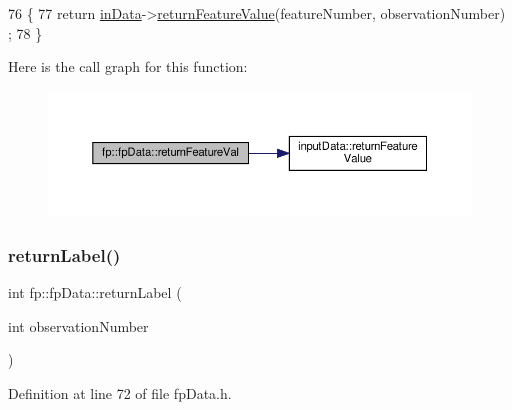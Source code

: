 \begin{DoxyCode}
76                                                                                                 \{
77                 \textcolor{keywordflow}{return} \hyperlink{classfp_1_1fpData_a49d7c3f58bcf88843c25b1b0c9714ebe}{inData}->\hyperlink{classinputData_a8914408ce5de02c3786dc7ff61f6cfab}{returnFeatureValue}(featureNumber, observationNumber)
      ;
78             \}
\end{DoxyCode}
Here is the call graph for this function\+:\nopagebreak
\begin{figure}[H]
\begin{center}
\leavevmode
\includegraphics[width=350pt]{classfp_1_1fpData_a6b359086ec1e5c534095600e2ed5575f_cgraph}
\end{center}
\end{figure}
\mbox{\label{classfp_1_1fpData_aac722f51424cb7f6ab7d89525f82cc72}} 
\subsubsection{\texorpdfstring{return\+Label()}{returnLabel()}}
{\footnotesize\ttfamily int fp\+::fp\+Data\+::return\+Label (\begin{DoxyParamCaption}\item[{int}]{observation\+Number }\end{DoxyParamCaption})\hspace{0.3cm}{\ttfamily [inline]}}



Definition at line 72 of file fp\+Data.\+h.



